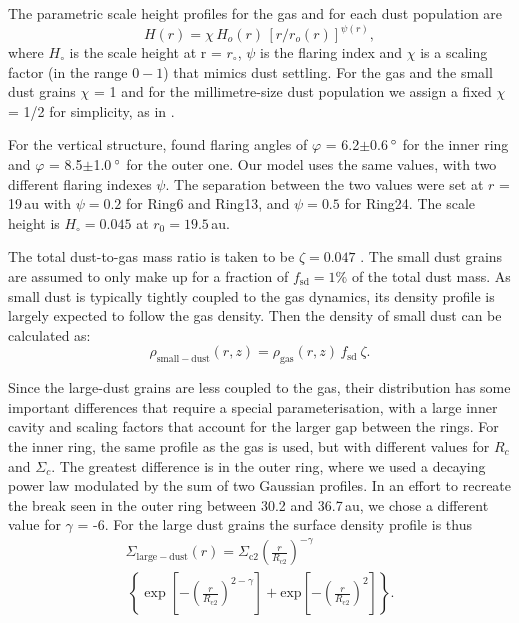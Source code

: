 \documentclass[letters,usenatbib,times]{mnras}
\begin{document}
The parametric scale height profiles for the gas and for each dust population are 
\begin{equation}
    \label{scale}
  H(r)=\chi \, H_{o}(r) \, [r/r_{o}(r)]^{\psi(r)},
\end{equation}
where $H_\circ$ is the scale height at r = $r_\circ$, $\psi$ is the flaring index and $\chi$ is a scaling factor (in the range $0-1$) that mimics dust settling. For the gas and the small dust grains $\chi$ = 1 and for the millimetre-size dust population we assign a fixed $\chi$ = 1/2 for simplicity, as in \citet{Rosenfeld_2013}.

For the vertical structure, \citet{dOrazi} found flaring angles of $\varphi$ = 6.2$\pm$0.6\,$\hbox{$^\circ$}$ for the inner ring and $\varphi$ = 8.5$\pm$1.0\,$\hbox{$^\circ$}$ for the outer one. Our model uses the same values, with two different flaring indexes $\psi$. The separation between the two values were set at $r$ = 19\,au with $\psi=0.2$ for Ring6 and Ring13, and $\psi=0.5$ for Ring24. The scale height is $H_\circ = 0.045$ at $r_0 = 19.5$\,au.

The total dust-to-gas mass ratio is taken to be $\zeta = 0.047$ \citep[as in][]{Rosenfeld_2013}. The small dust grains are assumed to only make up for a fraction of $f_\mathrm{sd}=1\%$ of the total dust mass. As small dust is typically tightly coupled to the gas dynamics, its density profile is largely expected to follow the gas density. Then the density of small dust can be calculated as:
\begin{equation}
\rho_{\mathrm{small-dust}}(r,z)=\rho_{\mathrm{gas}}(r,z)\, f_{\mathrm{sd}} \: \zeta .
\end{equation}

Since the large-dust grains are less coupled to the gas, their distribution has some important differences that require a special parameterisation, with a large inner cavity and scaling factors that account for the larger gap between the rings. For the inner ring, the same profile as the gas is used, but with different values for $R_c$ and $\Sigma_c$. The greatest difference is in the outer ring, where we used a decaying power law modulated by the sum of two Gaussian profiles. In an effort to recreate the break seen in the outer ring between 30.2 and 36.7\,au, we chose a different value for $\gamma$ = -6. For the large dust grains the surface density profile is thus
\begin{multline}
  \Sigma_{\mathrm{large-dust}}(r) = \Sigma_{\mathrm{c}2} \left(\frac{r}{R_{\mathrm{c}2}}\right)^{-\gamma} \\ \, \left\{ \exp\left[-\left(\frac{r}{R_{\mathrm{c}2}}\right)^{2-\gamma}\right] + \mathrm{exp}\left[-\left(\frac{r}{R_{\mathrm{c}2}}\right)^{2}\right]\right\}.
\end{multline}
\end{document}
